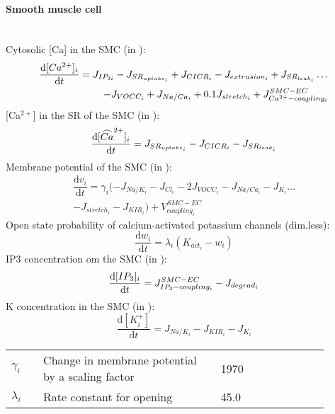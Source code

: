 \paragraph{Smooth muscle cell}~\\
%
Cytosolic [\gls{Ca}] in the \gls{SMC} (in \uM):
\begin{equation}\label{eq:ci}
\begin{split}
\dfrac{\mathrm{d}[Ca^{2+}]_{i}}{\mathrm{d}t} = J_{IP_{3i}} - J_{SR_{uptake_{i}}} + J_{CICR_{i}} - J_{extrusion_{i}} +  J_{SR_{leak_{i}}}\dots \\
 - J_{VOCC_{i}} + J_{Na/Ca_{i}}  + 0.1J_{stretch_{i}} + J_{Ca^{2+}-coupling_{i}}^{SMC-EC}
\end{split} 
\end{equation}
%
[Ca$^{2+}$] in the \gls{SR} of the \gls{SMC} (in \uM):
\begin{equation} \label{eq:si}
\dfrac{\mathrm{d}[\widehat{Ca}^{2+}]_{i}}{\mathrm{d}t} =  J_{SR_{uptake_{i}}} - J_{CICR_{i}} - J_{SR_{leak_{i}}}
\end{equation}
%
Membrane potential of the \gls{SMC} (in \mV):
\begin{equation} \label{eq:vi}
\begin{split}
\dfrac{\mathrm{d}v_{i}}{\mathrm{d}t} = \gamma_{i}( -J_{Na/K_{i}} - J_{Cl_{i}} - 2J_{VOCC_{i}}- J_{Na/Ca_{i}} - J_{K_{i}} \dots \\
- J_{stretch_{i}} - J_{KIR_{i}} ) +V^{SMC-EC}_{coupling_{i}}
\end{split}
\end{equation}
%
Open state probability of calcium-activated potassium channels (dim.less):
\begin{equation} \label{eq:dwidt}
\dfrac{\mathrm{d}w_{i}}{\mathrm{d}t} =  \lambda_{i} \left( K_{act_{i}} - w_{i} \right)
\end{equation}
%
\gls{IP3} concentration om the \gls{SMC} (in \uM):
\begin{equation} \label{eq:dIidt}
\dfrac{\mathrm{d}[IP_{3}] _{i}}{\mathrm{d}t} = J^{SMC-EC}_{IP_{3}-coupling_{i}} - J_{degrad_{i}}
\end{equation}
%
\gls{K} concentration in the \gls{SMC} (in \uM):
\begin{equation} \label{eq:dkidt}
\dfrac{\mathrm{d} [K^+_{i}]}{\mathrm{d}t}  = J_{Na/K_{i}}  - J_{KIR_{i}} - J_{K_{i}}
\end{equation}

\begin{table}[h!]
\centering
\begin{tabular}{ p{0.09\linewidth}  >{\footnotesize} p{0.5\linewidth}  >{\footnotesize} p{0.27\linewidth} >{\footnotesize} p{0.03\linewidth} }
\hline
$\gamma_{i}$				& Change in membrane potential by a scaling factor					& 1970 \mVpuM	& \cite{Koenigsberger2006} \\
$\lambda_{i} $				& Rate constant for opening											& 45.0 \pers 	& \cite{Koenigsberger2006} \\
\hline
\end{tabular}
\label{tab:dcidt}
\end{table}

